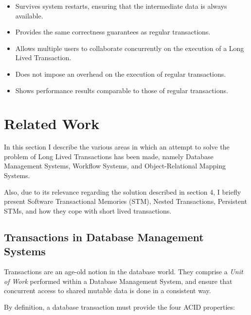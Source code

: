 \documentclass{llncs}
\begin{document}
\begin{itemize}

\item Survives system restarts, ensuring that the intermediate data is
  always available.

\item Provides the same correctness guarantees as regular transactions.

\item Allows multiple users to collaborate concurrently on the
  execution of a Long Lived Transaction.

\item Does not impose an overhead on the execution of regular
  transactions.

\item Shows performance results comparable to those of regular
  transactions.

\end{itemize}


\section{Related Work}
\label{chap:related}

In this section I describe the various areas in which an attempt to
solve the problem of Long Lived Transactions has been made, namely
Database Management Systems, Workflow Systems, and Object-Relational
Mapping Systems.

Also, due to its relevance regarding the solution described in section
4, I briefly present Software Transactional Memories (STM), Nested
Transactions, Persistent STMs, and how they cope with short lived
transactions.

\subsection{Transactions in Database Management Systems}
\label{sec:rdbms}

Transactions are an age-old notion in the database world. They
comprise a {\it Unit of Work} performed within a Database Management
System, and ensure that concurrent access to shared mutable data is
done in a consistent way.

By definition, a database transaction must provide the four ACID
properties:
\end{document}
